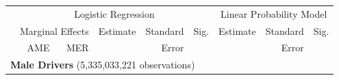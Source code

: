 
\begin{table}%
\centering 
\begin{tabular}{l r r r r l r r l} 

\hline 
 
 & \multicolumn{5}{c}{Logistic Regression}  & \multicolumn{3}{c}{Linear Probability Model} \\ 

 \cmidrule(lr){2-6}\cmidrule(lr){7-9} 
 & \multicolumn{2}{c}{Marginal Effects} & Estimate & Standard & Sig. & Estimate & Standard & Sig. \\ 

 \cmidrule(lr){2-3} 
 &   AME & MER &          &  Error   &      &          &  Error   &     \\ 

\hline 
 
\multicolumn{7}{l}{\textbf{Male Drivers} (5,335,033,221 observations)} \\ 


\end{tabular}
\end{table}
